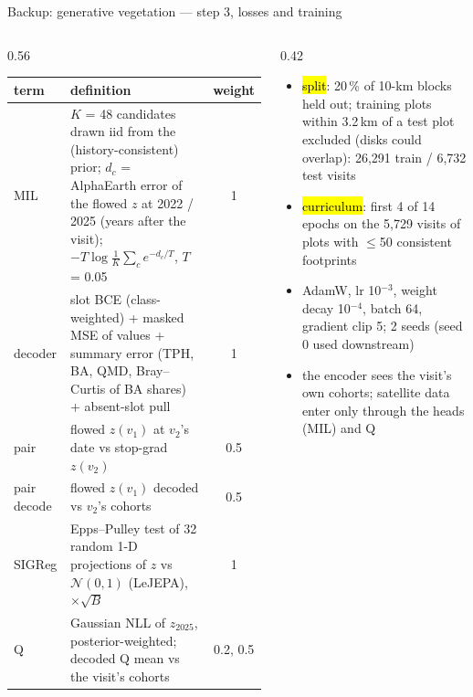 \begin{frame}{Backup: generative vegetation — step 3, losses and training}
\scriptsize
\begin{columns}[T]
\begin{column}{0.56\textwidth}
\renewcommand{\arraystretch}{1.12}
\begin{tabular}{@{}p{1.6cm}p{4.4cm}c@{}}
\toprule
term & definition & weight \\
\midrule
MIL & $K$ = 48 candidates drawn iid from the (history-consistent) prior; $d_c$ = AlphaEarth error of the flowed $z$ at 2022 / 2025 (years after the visit); $-T\log\frac1K\sum_c e^{-d_c/T}$, $T$ = 0.05 & 1 \\
decoder & slot BCE (class-weighted) + masked MSE of values + summary error (TPH, BA, QMD, Bray–Curtis of BA shares) + absent-slot pull & 1 \\
pair & flowed $z(v_1)$ at $v_2$'s date vs stop-grad $z(v_2)$ & 0.5 \\
pair decode & flowed $z(v_1)$ decoded vs $v_2$'s cohorts & 0.5 \\
SIGReg & Epps–Pulley test of 32 random 1-D projections of $z$ vs $\mathcal N(0,1)$ (LeJEPA), $\times\sqrt{B}$ & 1 \\
Q & Gaussian NLL of $z_{2025}$, posterior-weighted; decoded Q mean vs the visit's cohorts & 0.2, 0.5 \\
\bottomrule
\end{tabular}
\end{column}
\begin{column}{0.42\textwidth}
\begin{itemize}\setlength\itemsep{2pt}
\item \hl{split}: 20\,\% of 10-km blocks held out; training plots within 3.2\,km of a test plot excluded (disks could overlap): 26,291 train / 6,732 test visits
\item \hl{curriculum}: first 4 of 14 epochs on the 5,729 visits of plots with $\le$50 consistent footprints
\item AdamW, lr 10$^{-3}$, weight decay 10$^{-4}$, batch 64, gradient clip 5; 2 seeds (seed 0 used downstream)
\item the encoder sees the visit's own cohorts; satellite data enter only through the heads (MIL) and Q
\end{itemize}
\end{column}
\end{columns}
\end{frame}

